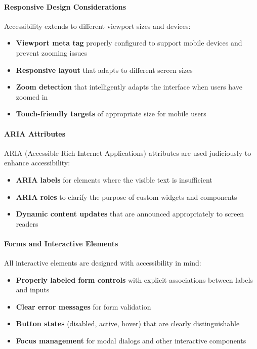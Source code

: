 \paragraph{Responsive Design Considerations}
Accessibility extends to different viewport sizes and devices:

\begin{itemize}
    \item \textbf{Viewport meta tag} properly configured to support mobile devices and prevent zooming issues
    \item \textbf{Responsive layout} that adapts to different screen sizes
    \item \textbf{Zoom detection} that intelligently adapts the interface when users have zoomed in
    \item \textbf{Touch-friendly targets} of appropriate size for mobile users
\end{itemize}

\paragraph{ARIA Attributes}
ARIA (Accessible Rich Internet Applications) attributes are used judiciously to enhance accessibility:

\begin{itemize}
    \item \textbf{ARIA labels} for elements where the visible text is insufficient
    \item \textbf{ARIA roles} to clarify the purpose of custom widgets and components
    \item \textbf{Dynamic content updates} that are announced appropriately to screen readers
\end{itemize}

\paragraph{Forms and Interactive Elements}
All interactive elements are designed with accessibility in mind:

\begin{itemize}
    \item \textbf{Properly labeled form controls} with explicit associations between labels and inputs
    \item \textbf{Clear error messages} for form validation
    \item \textbf{Button states} (disabled, active, hover) that are clearly distinguishable
    \item \textbf{Focus management} for modal dialogs and other interactive components
\end{itemize}

